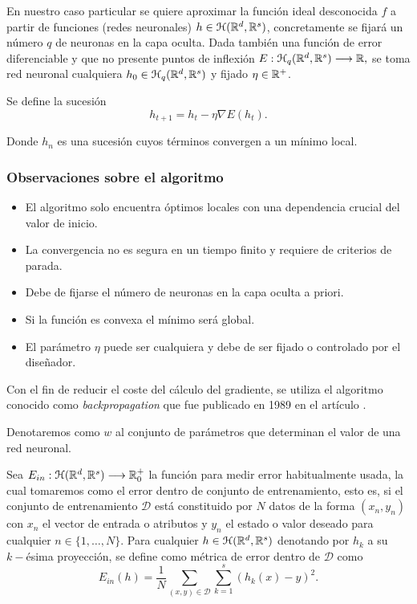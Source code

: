 En nuestro caso particular se quiere aproximar la función ideal desconocida $f$ a partir de funciones (redes neuronales) $h \in \mathcal{H}(\mathbb{R}^d,\mathbb{R}^s)$, concretamente se fijará un número $q$ de neuronas en la capa oculta. 
Dada también una función de error diferenciable y que no presente puntos de inflexión
$E: \mathcal{H}_q (\mathbb{R}^d, \mathbb{R}^s) \longrightarrow \mathbb{R},$
se toma red neuronal cualquiera $h_0 \in \mathcal{H}_q (\mathbb{R}^d, \mathbb{R}^s)$ y 
fijado $\eta \in \mathbb{R}^+$. 

Se define la sucesión 
\begin{equation}\label{eq:descenso-gradiente}
    h_{t+1}  = h_t - \eta \nabla E(h_t).
\end{equation}  

Donde $h_n$ es una sucesión cuyos términos convergen a un mínimo local.
\subsubsection*{Observaciones sobre el algoritmo }

\begin{itemize}
    \item El algoritmo solo encuentra óptimos locales con una dependencia crucial del valor de inicio. 
    \item La convergencia no es segura en un tiempo finito y requiere de criterios de parada. 
    \item Debe de fijarse el número de neuronas en la capa oculta a priori.
    \item Si la función es convexa el mínimo será global.
    \item El parámetro $\eta$ puede ser cualquiera y debe de ser fijado o controlado por el diseñador.  
\end{itemize}


Con el fin de reducir el coste del cálculo del gradiente, 
se utiliza el algoritmo conocido como \textit{backpropagation} que fue publicado en 
1989 en el artículo \cite{backpropagation-Hinton}. 

Denotaremos como $w$ al conjunto de parámetros que determinan el valor de una red neuronal. 

 Sea $E_{in} : \mathcal{H}(\mathbb{R}^d,\mathbb{R}^s) \longrightarrow \mathbb{R}^+_0$ la función para medir error habitualmente usada, la cual tomaremos como el error dentro de conjunto de entrenamiento, esto es,  si el conjunto 
de entrenamiento $\mathcal{D}$ está constituido por $N$ datos de la forma $(x_n, y_n)$ con $x_n$ el vector de entrada o atributos y $y_n$ el estado o valor deseado para cualquier $n\in \{1, \ldots, N\}.$ Para cualquier $h \in \mathcal{H}(\mathbb{R}^d,\mathbb{R}^s)$ denotando por $h_k$ a su $k-$ésima proyección, se define como métrica de error dentro de $\mathcal{D}$ como
\begin{equation}
    E_{in}(h) = \frac{1}{N} \sum_{(x,y) \in \mathcal{D}} \sum_{k=1}^s(h_k(x)- y)^2. 
\end{equation}

